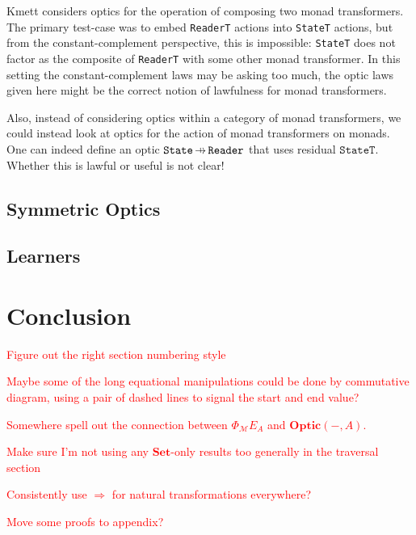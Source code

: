\documentclass[11pt,letterpaper]{article}
\theoremstyle{plain}
\theoremstyle{definition}
\newcommand{\M}{\mathscr{M}}
\newcommand{\Pastro}{\Phi}
\newcommand{\Set}{\mathbf{Set}}
\newcommand{\Optic}{\mathbf{Optic}}
\newcommand{\hto}{\ensuremath{\,\mathaccent\shortmid\rightarrow\,}}
\newcommand{\todo}[1]{\textcolor{red}{\small #1}}
\begin{document}
Kmett considers optics for the operation of composing two monad transformers. The primary test-case was to embed \texttt{ReaderT} actions into \texttt{StateT} actions, but from the constant-complement perspective, this is impossible: \texttt{StateT} does not factor as the composite of \texttt{ReaderT} with some other monad transformer. In this setting the constant-complement laws may be asking too much, the optic laws given here might be the correct notion of lawfulness for monad transformers.

Also, instead of considering optics within a category of monad transformers, we could instead look at optics for the action of monad transformers on monads. One can indeed define an optic $\texttt{State} \hto \texttt{Reader}$ that uses residual $\texttt{StateT}$. Whether this is lawful or useful is not clear!

\subsection{Symmetric Optics}

\subsection{Learners}

\section{Conclusion}

\todo{Figure out the right section numbering style}

\todo{Maybe some of the long equational manipulations could be done by commutative diagram, using a pair of dashed lines to signal the start and end value?}

\todo{Somewhere spell out the connection between $\Pastro_\M E_A$ and $\Optic(-, A)$.}

\todo{Make sure I'm not using any $\Set$-only results too generally in the traversal section}

\todo{Consistently use $\Rightarrow$ for natural transformations everywhere?}

\todo{Move some proofs to appendix?}



\end{document}
